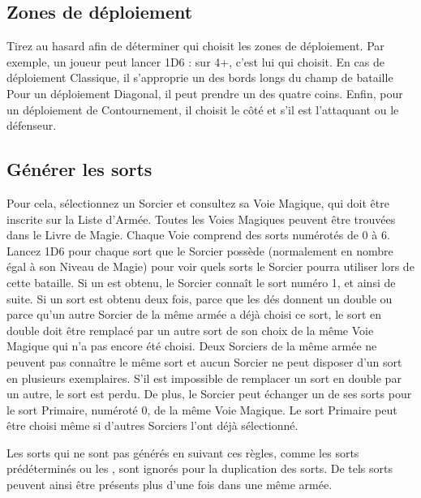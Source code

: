 \subsection{Zones de déploiement}

Tirez au hasard afin de déterminer qui choisit les zones de déploiement. Par exemple, un joueur peut lancer 1D6 : sur 4+, c'est lui qui choisit. En cas de déploiement Classique, il s'approprie un des bords longs du champ de bataille Pour un déploiement Diagonal, il peut prendre un des quatre coins. Enfin, pour un déploiement de Contournement, il choisit le côté et s'il est l'attaquant ou le défenseur.

\newpage
\subsection{Générer les sorts}
\label{generating_spells}

 Pour cela, sélectionnez un Sorcier et consultez sa Voie Magique, qui doit être inscrite sur la Liste d'Armée. Toutes les Voies Magiques peuvent être trouvées dans le Livre de Magie. Chaque Voie comprend des sorts numérotés de 0 à 6. Lancez 1D6 pour chaque sort que le Sorcier possède (normalement en nombre égal à son Niveau de Magie) pour voir quels sorts le Sorcier pourra utiliser lors de cette bataille. Si un  est obtenu, le Sorcier connaît le sort numéro 1, et ainsi de suite. Si un sort est obtenu deux fois, parce que les dés donnent un double ou parce qu'un autre Sorcier de la même armée a déjà choisi ce sort, le sort en double doit être remplacé par un autre sort de son choix de la même Voie Magique qui n'a pas encore été choisi. Deux Sorciers de la même armée ne peuvent pas connaître le même sort et aucun Sorcier ne peut disposer d'un sort en plusieurs exemplaires. S'il est impossible de remplacer un sort en double par un autre, le sort est perdu. De plus, le Sorcier peut échanger un de ses sorts pour le sort Primaire, numéroté 0, de la même Voie Magique. Le sort Primaire peut être choisi même si d'autres Sorciers l'ont déjà sélectionné.

Les sorts qui ne sont pas générés en suivant ces règles, comme les sorts prédéterminés ou les \boundspells{}, sont ignorés pour la duplication des sorts. De tels sorts peuvent ainsi être présents plus d'une fois dans une même armée.
